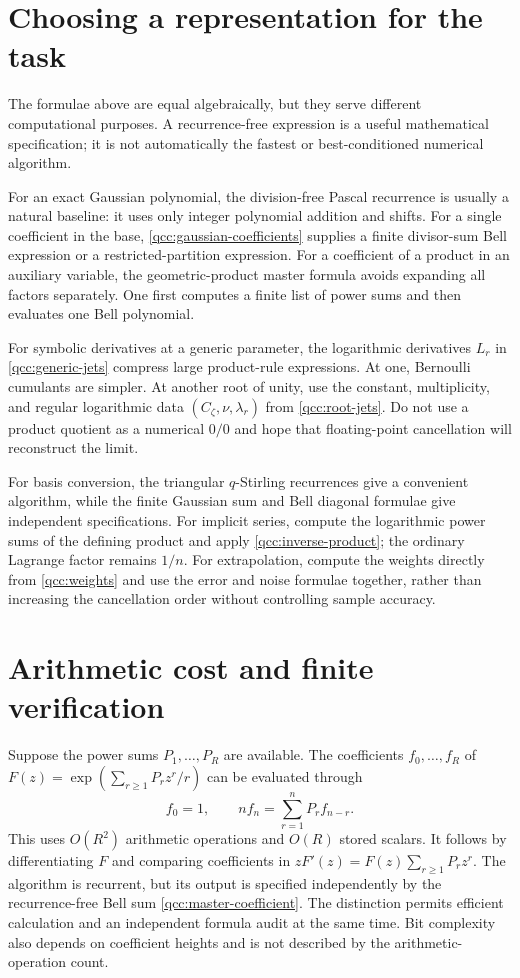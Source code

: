 \documentclass[11pt,a4paper,oneside,openany]{book}
\theoremstyle{definition}
\theoremstyle{remark}
\begin{document}
\section{Choosing a representation for the task}
The formulae above are equal algebraically, but they serve different
computational purposes. A recurrence-free expression is a useful mathematical
specification; it is not automatically the fastest or best-conditioned numerical
algorithm.

For an exact Gaussian polynomial, the division-free Pascal recurrence is usually
a natural baseline: it uses only integer polynomial addition and shifts. For a
single coefficient in the base, \cref{qcc:gaussian-coefficients} supplies a
finite divisor-sum Bell expression or a restricted-partition expression. For a
coefficient of a product in an auxiliary variable, the geometric-product master
formula avoids expanding all factors separately. One first computes a finite
list of power sums and then evaluates one Bell polynomial.

For symbolic derivatives at a generic parameter, the logarithmic derivatives
\(L_r\) in \cref{qcc:generic-jets} compress large product-rule expressions.
At one, Bernoulli cumulants are simpler. At another root of unity, use the
constant, multiplicity, and regular logarithmic data \((C_\zeta,\nu,\lambda_r)\)
from \cref{qcc:root-jets}. Do not use a product quotient as a numerical
\(0/0\) and hope that floating-point cancellation will reconstruct the limit.

For basis conversion, the triangular \(q\)-Stirling recurrences give a
convenient algorithm, while the finite Gaussian sum and Bell diagonal formulae
give independent specifications. For implicit series, compute the logarithmic
power sums of the defining product and apply \cref{qcc:inverse-product}; the
ordinary Lagrange factor remains \(1/n\). For extrapolation, compute the
weights directly from \eqref{qcc:weights} and use the error and noise formulae
together, rather than increasing the cancellation order without controlling
sample accuracy.

\section{Arithmetic cost and finite verification}
Suppose the power sums \(P_1,\ldots,P_R\) are available. The coefficients
\(f_0,\ldots,f_R\) of
\(F(z)=\exp(\sum_{r\ge1}P_rz^r/r)\) can be evaluated through
\begin{equation}\label{qcc:coefficient-algorithm}
 f_0=1,\qquad nf_n=\sum_{r=1}^{n}P_rf_{n-r}.
\end{equation}
This uses \(O(R^2)\) arithmetic operations and \(O(R)\) stored scalars.
It follows by differentiating \(F\) and comparing coefficients in
\(zF'(z)=F(z)\sum_{r\ge1}P_rz^r\). The algorithm is recurrent, but
its output is specified independently by the recurrence-free Bell sum
\eqref{qcc:master-coefficient}. The distinction permits efficient calculation
and an independent formula audit at the same time. Bit complexity also depends
on coefficient heights and is not described by the arithmetic-operation count.
\end{document}
